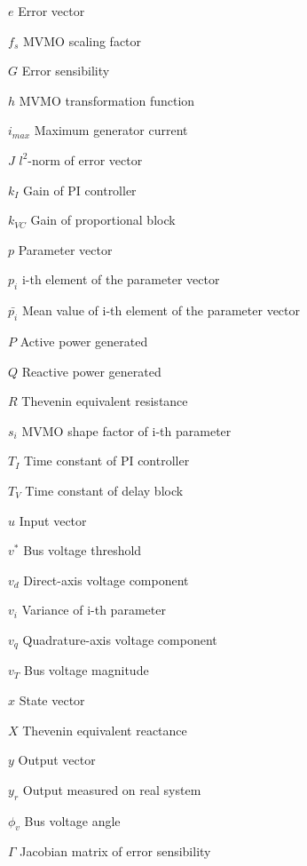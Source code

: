 \documentclass[
12pt,		%
openright,	%
twoside,  %
a4paper,			%
chapter=TITLE,		%
brazil,				%
french,				%
spanish,			%
english				%
]{USPSC}
\begin{document}
\begin{simbolos}
	\item[$e$] Error vector
	\item[$f_{s}$] MVMO scaling factor
	\item[$G$] Error sensibility
	\item[$h$] MVMO transformation function
	\item[$i_{max}$] Maximum generator current
	\item[$J$] $l^{2}$-norm of error vector
	\item[$k_{I}$]	Gain of PI controller
	\item[$k_{VC}$] Gain of proportional block
	\item[$p$] Parameter vector
	\item[$p_{i}$] i-th element of the parameter vector
	\item[$\bar{p_{i}}$] Mean value of i-th element of the parameter vector
	\item[$P$] Active power generated
	\item[$Q$] Reactive power generated
	\item[$R$] Thevenin equivalent resistance
	\item[$s_{i}$] MVMO shape factor of i-th parameter
	\item[$T_{I}$] Time constant of PI controller
	\item[$T_{V}$] Time constant of delay block
	\item[$u$] Input vector
	\item[$v^{*}$] Bus voltage threshold
	\item[$v_{d}$] Direct-axis voltage component
	\item[$v_{i}$] Variance of i-th parameter
	\item[$v_{q}$] Quadrature-axis voltage component
	\item[$v_{T}$] Bus voltage magnitude
	\item[$x$] State vector
	\item[$X$] Thevenin equivalent reactance
	\item[$y$] Output vector
	\item[$y_{r}$] Output measured on real system
	\item[$\phi_{v}$] Bus voltage angle
	\item[$\Gamma$] Jacobian matrix of error sensibility
\end{simbolos}
\tableofcontents*
\cleardoublepage
\textual
\end{document}
